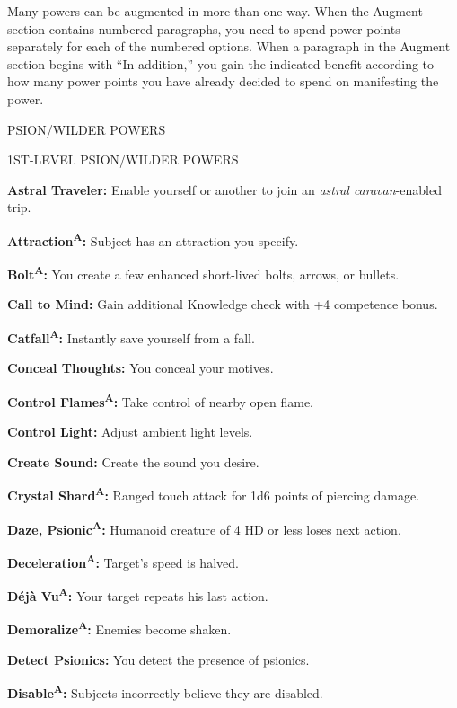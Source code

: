 \documentclass{article}
\begin{document}
Many powers can be augmented in more than one way. When the Augment section contains 
numbered paragraphs, you need to spend power points separately for each of the 
numbered options. When a paragraph in the Augment section begins with ``In addition,'' 
you gain the indicated benefit according to how many power points you have already 
decided to spend on manifesting the power.

\vspace{12pt}
{\LARGE{}PSION/WILDER POWERS}

1ST-LEVEL PSION/WILDER POWERS

\textbf{Astral Traveler: }Enable yourself or another to join an \textit{astral 
caravan}-enabled trip.

\textbf{Attraction}\textsuperscript{\textbf{A}}\textbf{: }Subject has an attraction 
you specify.

\textbf{Bolt}\textsuperscript{\textbf{A}}\textbf{: }You create a few enhanced short-lived 
bolts, arrows, or bullets.

\textbf{Call to Mind: }Gain additional Knowledge check with +4 competence bonus.

\textbf{Catfall}\textsuperscript{\textbf{A}}\textbf{: }Instantly save yourself 
from a fall.

\textbf{Conceal Thoughts: }You conceal your motives.

\textbf{Control Flames}\textsuperscript{\textbf{A}}\textbf{: }Take control of nearby 
open flame.

\textbf{Control Light: }Adjust ambient light levels.

\textbf{Create Sound: }Create the sound you desire.

\textbf{Crystal Shard}\textsuperscript{\textbf{A}}\textbf{: }Ranged touch attack 
for 1d6 points of piercing damage.

\textbf{Daze, Psionic}\textsuperscript{\textbf{A}}\textbf{: }Humanoid creature 
of 4 HD or less loses next action.

\textbf{Deceleration}\textsuperscript{\textbf{A}}\textbf{: }Target's speed is halved.

\textbf{Déjà Vu}\textsuperscript{\textbf{A}}\textbf{: }Your target repeats his 
last action.

\textbf{Demoralize}\textsuperscript{\textbf{A}}\textbf{: }Enemies become shaken.

\textbf{Detect Psionics: }You detect the presence of psionics.

\textbf{Disable}\textsuperscript{\textbf{A}}\textbf{: }Subjects incorrectly believe 
they are disabled.
\end{document}
